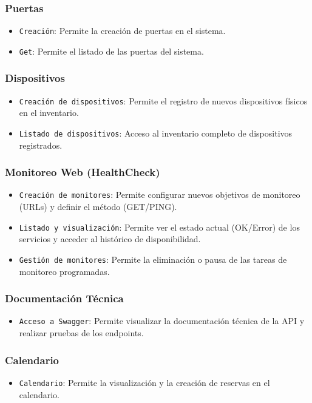\subsubsection{Puertas}
\begin{itemize}
  \item \texttt{Creación}: Permite la creación de puertas en el sistema.
  \item \texttt{Get}: Permite el listado de las puertas del sistema.
\end{itemize}

\subsubsection{Dispositivos}
\begin{itemize}
  \item \texttt{Creación de dispositivos}: Permite el registro de nuevos dispositivos físicos en el inventario.
  \item \texttt{Listado de dispositivos}: Acceso al inventario completo de dispositivos registrados.
\end{itemize}

\subsubsection{Monitoreo Web (HealthCheck)}
\begin{itemize}
  \item \texttt{Creación de monitores}: Permite configurar nuevos objetivos de monitoreo (URLs) y definir el método (GET/PING).
  \item \texttt{Listado y visualización}: Permite ver el estado actual (OK/Error) de los servicios y acceder al histórico de disponibilidad.
  \item \texttt{Gestión de monitores}: Permite la eliminación o pausa de las tareas de monitoreo programadas.
\end{itemize}

\subsubsection{Documentación Técnica}
\begin{itemize}
  \item \texttt{Acceso a Swagger}: Permite visualizar la documentación técnica de la API y realizar pruebas de los endpoints.
\end{itemize}

\subsubsection{Calendario}
\begin{itemize}
  \item \texttt{Calendario}: Permite la visualización y la creación de reservas en el calendario.
\end{itemize}

